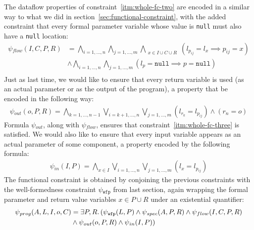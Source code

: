 The dataflow properties of constraint~\ref{itm:whole-fc-two} are encoded in a
similar way to what we did in section~\ref{sec:functional-constraint}, with the
added constraint that every formal parameter variable whose value is
\lstinline{null} must also have a \lstinline{null} location:
%
\begin{align*}
  \psi{}_{flow}(I, C, P, R)
  &=\bigwedge_{i=1,\ldots,n}
    \bigwedge_{j=1,\ldots,m}
    \bigwedge_{\substack{x \in I \cup C \cup R}}
    (l_{p_{ij}} = l_x \implies p_{ij} = x) \\
  &\wedge\bigwedge_{i=1,\ldots,n}
    \bigwedge_{j=1,\ldots,m}
    (l_p = \mathtt{null} \implies p = \mathtt{null}) \\
\end{align*}
%
\noindent
Just as last time, we would like to ensure that every return variable is used
(as an actual parameter or as the output of the program), a property that be
encoded in the following way:
%
\begin{align*}
  \psi{}_{out}(o, P, R)
  =\bigwedge_{k=1,\ldots,n-1}
    \bigvee_{i=k+1,\ldots,n}
    \bigvee_{j=1,\ldots,m}
    (l_{r_k} = l_{p_{ij}})
  \wedge (r_n = o)
\end{align*}
%
\noindent
Formula $\psi{}_{out}$, along with $\psi{}_{flow}$, ensures that
constraint~\ref{itm:whole-fc-three} is satisfied.
We would also like to ensure that every input variable appears as an actual
parameter of some component, a property encoded by the following formula:
%
\begin{align*}
  \psi{}_{in}(I, P)
  =\bigwedge_{x \in I}
    \bigvee_{i=1,\ldots,n}
    \bigvee_{j=1,\ldots,m}
    (l_{x} = l_{p_{ij}})
\end{align*}
%
The functional constraint is obtained by conjoining the previous constraints
with the well-formedness constraint $\psi{}_{\mathtt{wfp}}$ from last section,
again wrapping the formal parameter and return value variables $x \in P \cup R$
under an existential quantifier:
%
%
\begin{align*}
  \psi{}_{prog}(A, L, I, o, C) &= \exists P,R\ldotp
  (\psi{}_{\mathtt{wfp}}(L, P) \wedge
  \psi{}_{spec}(A, P, R) \wedge
  \psi{}_{flow}(I, C, P, R)\\&\wedge 
  \psi{}_{out}(o, P, R) \wedge
  \psi{}_{in}(I, P))
\end{align*}